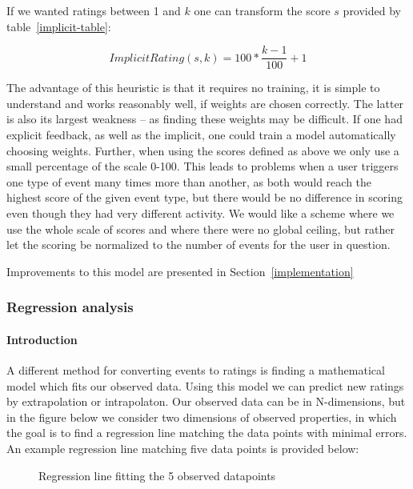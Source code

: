 If we wanted ratings between 1 and $k$ one can transform the score $s$ provided
by table~\ref{implicit-table}:

\begin{equation}
  ImplicitRating(s, k) = 100 * \frac{k-1}{100} + 1
\end{equation}

The advantage of this heuristic is that it requires no training, it is simple
to understand and works reasonably well, if weights are chosen correctly.
The latter is also its largest weakness – as finding these weights may be
difficult. If one had explicit feedback, as well as the implicit, one could
train a model automatically choosing weights. Further, when using the scores
defined as above we only use a small percentage of the scale 0-100. This leads
to problems when a user triggers one type of event many times more than
another, as both would reach the highest score of the given event type, but
there would be no difference in scoring even though they had very different
activity. We would like a scheme where we use the whole scale of scores and
where there were no global ceiling, but rather let the scoring be normalized to
the number of events for the user in question.

Improvements to this model are presented in Section~\ref{implementation}

\subsubsection{Regression analysis}

\paragraph{Introduction}
A different method for converting events to ratings is finding a mathematical
model which fits our observed data. Using this model we can predict new ratings
by extrapolation or intrapolaton. Our observed data can be in N-dimensions, but
in the figure below we consider two dimensions of observed properties, in which
the goal is to find a regression line matching the data points with minimal
errors. An example regression line matching five data points is provided below:

\begin{figure}[H]
  \centering
  \label{fig-regression}
  \caption{Regression line fitting the 5 observed datapoints}
\end{figure}

